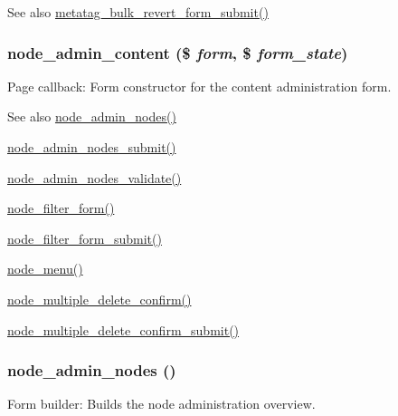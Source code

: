 \begin{DoxySeeAlso}{See also}
\hyperlink{metatag_8admin_8inc_a175595665a6d1fead2df7b214a3845d8}{metatag\_\-bulk\_\-revert\_\-form\_\-submit()} 
\end{DoxySeeAlso}
\hypertarget{group__forms_ga9e864b6f961a37906f23989987913091}{
\subsubsection[{node\_\-admin\_\-content}]{\setlength{\rightskip}{0pt plus 5cm}node\_\-admin\_\-content (\$ {\em form}, \/  \$ {\em form\_\-state})}}
\label{group__forms_ga9e864b6f961a37906f23989987913091}
Page callback: Form constructor for the content administration form.

\begin{DoxySeeAlso}{See also}
\hyperlink{group__forms_ga3fb56c702a3c16eddd2fcd8ccd3e4adb}{node\_\-admin\_\-nodes()} 

\hyperlink{node_8admin_8inc_a5f159cfed0d6cce65d5d70747efec391}{node\_\-admin\_\-nodes\_\-submit()} 

\hyperlink{node_8admin_8inc_a32a9ea91250aaf84de44f784a3569944}{node\_\-admin\_\-nodes\_\-validate()} 

\hyperlink{group__forms_ga2b7edb82b488db11ffde4fa60958004d}{node\_\-filter\_\-form()} 

\hyperlink{node_8admin_8inc_a346f00ebb9b4aae36025623d893c5061}{node\_\-filter\_\-form\_\-submit()} 

\hyperlink{node_8module_a15e8d85a7559f22b8f2c77c1d5dfac63}{node\_\-menu()} 

\hyperlink{group__forms_ga25cc06a5aa3aa17eadc5a8a97e7c5e9e}{node\_\-multiple\_\-delete\_\-confirm()} 

\hyperlink{node_8admin_8inc_ab8a2e11edeef2797ca739f94d1eb1af9}{node\_\-multiple\_\-delete\_\-confirm\_\-submit()} 
\end{DoxySeeAlso}
\hypertarget{group__forms_ga3fb56c702a3c16eddd2fcd8ccd3e4adb}{
\subsubsection[{node\_\-admin\_\-nodes}]{\setlength{\rightskip}{0pt plus 5cm}node\_\-admin\_\-nodes ()}}
\label{group__forms_ga3fb56c702a3c16eddd2fcd8ccd3e4adb}
Form builder: Builds the node administration overview.

